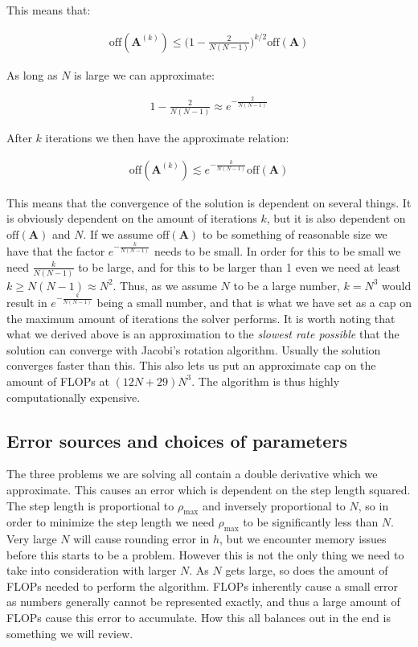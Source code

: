 \documentclass[reprint,english,notitlepage]{revtex4-1}  %
\begin{document}
This means that:

\begin{align*}
\text{off}(\textbf{A}^{(k)}) \leq \bigg(1 - \frac{2}{N(N-1)}\bigg)^{k/2} \text{off}(\textbf{A})
\end{align*}

As long as $N$ is large we can approximate:

\begin{align*}
1 - \frac{2}{N(N-1)} \approx e^{-\frac{2}{N(N-1)}}
\end{align*}

After $k$ iterations we then have the approximate relation:

\begin{align*}
\text{off}(\textbf{A}^{(k)}) \lesssim e^{-\frac{k}{N(N-1)}} \text{off}(\textbf{A})
\end{align*}

This means that the convergence of the solution is dependent on several things. It is obviously dependent on the amount of iterations $k$, but it is also dependent on $\text{off}(\textbf{A})$ and $N$. If we assume $\text{off}(\textbf{A})$ to be something of reasonable size we have that the factor $e^{-\frac{k}{N(N-1)}}$ needs to be small. In order for this to be small we need $\frac{k}{N(N-1)}$ to be large, and for this to be larger than 1 even we need at least $k \geq N(N-1) \approx N^2$. Thus, as we assume $N$ to be a large number, $k = N^3$ would result in $e^{-\frac{k}{N(N-1)}}$ being a small number, and that is what we have set as a cap on the maximum amount of iterations the solver performs. It is worth noting that what we derived above is an approximation to the \textit{slowest rate possible} that the solution can converge with Jacobi's rotation algorithm. Usually the solution converges faster than this. This also lets us put an approximate cap on the amount of FLOPs at $(12N + 29)N^3$. The algorithm is thus highly computationally expensive.


\subsection{Error sources and choices of parameters} \label{sec:III:b}

The three problems we are solving all contain a double derivative which we approximate. This causes an error which is dependent on the step length squared. The step length is proportional to $\rho_\text{max}$ and inversely proportional to $N$, so in order to minimize the step length we need $\rho_\text{max}$ to be significantly less than $N$. Very large $N$ will cause rounding error in $h$, but we encounter memory issues before this starts to be a problem. However this is not the only thing we need to take into consideration with larger $N$. As $N$ gets large, so does the amount of FLOPs needed to perform the algorithm. FLOPs inherently cause a small error as numbers generally cannot be represented exactly, and thus a large amount of FLOPs cause this error to accumulate. How this all balances out in the end is something we will review.
\end{document}
